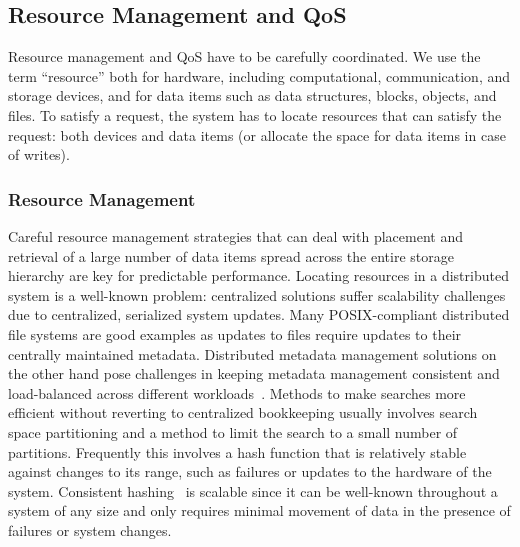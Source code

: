 \subsection{Resource Management and QoS}
\label{sec:qos}

Resource management and QoS have to be carefully coordinated. We use the term ``resource'' both for hardware, including computational, communication, and storage devices, and for data items such as data structures, blocks, objects, and files. To satisfy a request, the system has to locate resources that can satisfy the request: both devices and data items (or allocate the space for data items in case of writes).

\subsubsection{Resource Management}
Careful resource management strategies that can deal with placement and
retrieval of a large number of data items spread across the entire storage
hierarchy are key for predictable performance. 
Locating resources in a distributed system is a well-known problem: centralized
solutions suffer scalability challenges due to centralized, serialized system
updates. Many POSIX-compliant distributed file systems are good examples as updates to files require updates to their centrally maintained
metadata. %
Distributed metadata management solutions on the other hand pose
challenges in keeping metadata management consistent and load-balanced
across different workloads~\cite{sevilla:sc15}. Methods to make
searches more efficient without reverting to centralized
bookkeeping usually involves search space partitioning and a method to limit
the search to a small number of partitions.  Frequently this involves a
hash function that is relatively stable against changes to its range, such as
failures or updates to the hardware of the system. Consistent
hashing~\cite{karger:stoc97} is scalable since it can be well-known throughout
a system of any size and only requires minimal movement of data in the presence
of failures or system changes. 

